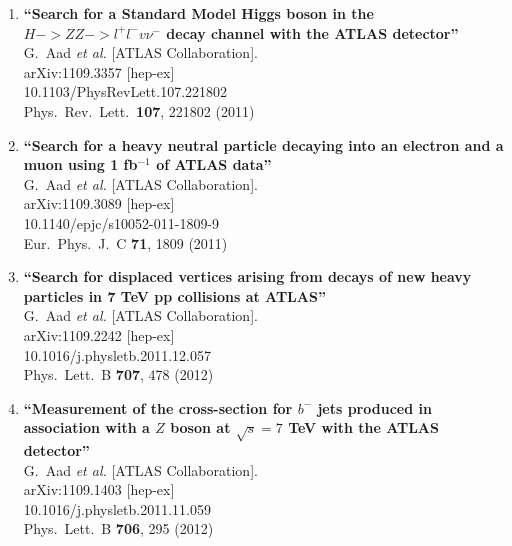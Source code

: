 \documentclass{article}
\begin{document}
\begin{enumerate}
\item%
{\bf ``Search for a Standard Model Higgs boson in the $H -> ZZ -> l^+l^-v\nu^-$ decay channel with the ATLAS detector''}
  \\{}G.~Aad {\it et al.}  [ATLAS Collaboration].
  \\{}arXiv:1109.3357 [hep-ex]
    \\{}10.1103/PhysRevLett.107.221802
\\{}Phys.\ Rev.\ Lett.\  {\bf 107}, 221802 (2011) %


\item%
{\bf ``Search for a heavy neutral particle decaying into an electron and a muon using 1 fb$^{-1}$ of ATLAS data''}
  \\{}G.~Aad {\it et al.}  [ATLAS Collaboration].
  \\{}arXiv:1109.3089 [hep-ex]
    \\{}10.1140/epjc/s10052-011-1809-9
\\{}Eur.\ Phys.\ J.\ C {\bf 71}, 1809 (2011) %


\item%
{\bf ``Search for displaced vertices arising from decays of new heavy particles in 7 TeV pp collisions at ATLAS''}
  \\{}G.~Aad {\it et al.}  [ATLAS Collaboration].
  \\{}arXiv:1109.2242 [hep-ex]
    \\{}10.1016/j.physletb.2011.12.057
\\{}Phys.\ Lett.\ B {\bf 707}, 478 (2012) %


\item%
{\bf ``Measurement of the cross-section for $b^-$ jets produced in association with a $Z$ boson at $\sqrt{s}=7$ TeV with the ATLAS detector''}
  \\{}G.~Aad {\it et al.}  [ATLAS Collaboration].
  \\{}arXiv:1109.1403 [hep-ex]
    \\{}10.1016/j.physletb.2011.11.059
\\{}Phys.\ Lett.\ B {\bf 706}, 295 (2012) %



\end{enumerate}
\end{document}
